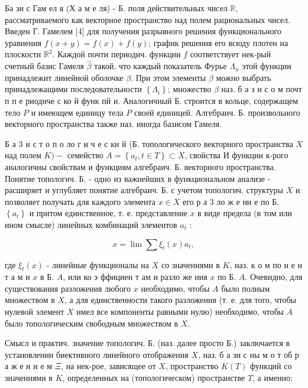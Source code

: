 \documentclass[10pt]{article}
\begin{document}
Ба зи с Гам ел я (Х а м е ля) - Б. поля действительных чисел $\mathbb{R}$, рассматриваемого как векторное пространство над полем рациональных чисел. Введен Г. Гамелем [4] для получения разрывного решения функционального уравнения $f(x+y)=f(x)+f(y)$; график решения его всюду плотен на плоскости $\mathbb{R}^{2}$. Каждой почти периодич. функции $f$ соответствует нек-рый счетный базис Гамеля $\hat{\beta}$ такой, что каждый показатель Фурье $\Lambda_{n}$ этой функции принадлежит линейной оболочке $\beta$. При этом элементы $\beta$ можно выбрать принадлежащими последовательности $\left\{\Lambda_{i}\right\}$; множество $\beta$ наз. б а з и с о м почт п п е риодиче с ко й функ пй и. Аналогичный Б. строится в кольце, содержащем тело $P$ и имеющем единицу тела $P$ своей единицей. Алгебраич. Б. произвольного векторного пространства также наз. иногда базисом Гамеля.



Б а 3 и с т о п о ло г и ч е с ки й (Б. топологического векторного пространства $X$ над полем $K)-$ семейство $A=\left\{a_{t}, t \in T\right\} \subset X$, свойства И функции к-рого аналогичны свойствам и функциям алгебраич. Б. векторного пространства. Понятие топологич. Б. - одно из важнейших в функциональном анализе - расширяет и углубляет понятие алгебраич. Б. с учетом топологич. структуры $X$ и позволяет получать для каждого элемента $x \in X$ его р а 3 ло ж е ни е по Б. $\left\{a_{t}\right\}$ и притом единственное, т. е. представление $x$ в виде предела (в том или ином смысле) линейных комбинаций элементов $a_{t}$ :



\[

x=\lim \sum \xi_{t}(x) a_{t},

\]



где $\xi_{t}(x)$ - линейные функционалы на $X$ со значениями в $K$, наз. к о м по н е н т а м и $x$ в Б. $A$, или ко э ффициен т ам и разло же ния $x$ по Б. $A$. Очевидно, для существования разложения любого $x$ необходимо, чтобы $A$ было полным множеством в $X$, а для единственности такого разложения (т. е. для того, чтобы нулевой элемент $X$ имел все компоненты равными нулю) необходимо, чтобы $A$ было топологическим свободным множеством в $X$.



Смысл и практич. значение топологич. Б. (наз. далее просто Б.) заключается в установлении биективного линейного отображения $X$, наз. б а зи с ны м о т об р а ж е н и е м $\Xi$, на нек-рое, зависящее от $X$, пространство $K(T)$ функций со значениями в $K$, определенных на (топологическом) пространстве $T$, а именно:
\end{document}
